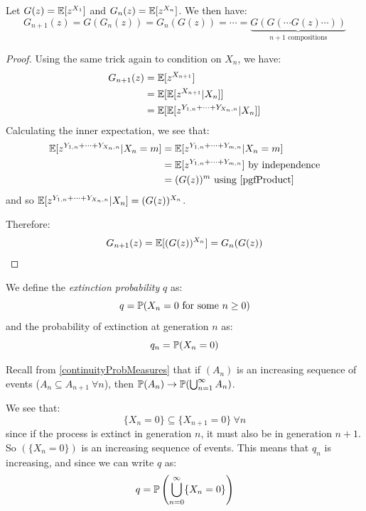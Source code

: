 \documentclass[../main.tex]{subfiles}
\begin{document}
\begin{theorem}
  Let $G(z) = \E[z^{X_1}]$ and $G_n(z) = \E[z^{X_n}]$.
  We then have:
  \label{GRecurrence}
  \[
    G_{n + 1}(z) = G(G_{n}(z)) = G_n(G(z)) = \cdots = \underbrace{G(G(\cdots G(z) \cdots))}_{n + 1 \text{ compositions}}
  \]
\end{theorem}
\begin{proof}
  Using the same trick again to condition on $X_n$, we have:
  \begin{align*}
    G_{n + 1}(z) &= \E[z^{X_{n + 1}}] \\
                 &= \E[\E[z^{X_{n + 1}} \vert X_n]] \\
                 &= \E[\E[z^{Y_{1, n} + \cdots + Y_{X_n, n}} \vert X_n]]
  \end{align*}
  Calculating the inner expectation, we see that:
  \begin{align*}
    \E[z^{Y_{1, n} + \cdots + Y_{X_n, n}} \vert X_n = m] &= \E[z^{Y_{1, n} + \cdots + Y_{m, n}} \vert X_n = m]\\
                                                         &= \E[z^{Y_{1, n} + \cdots + Y_{m, n}}] \text{ by independence}\\
                                                         &= (G(z))^{m} \text{ using \cref{pgfProduct}}
  \end{align*}
  and so $\E[z^{Y_{1, n} + \cdots + Y_{X_n, n}} \vert X_n] = (G(z))^{X_n}$.

  Therefore:
  \[
    G_{n + 1}(z) = \E[(G(z))^{X_n}] = G_n(G(z))
  \]
\end{proof}
\begin{definition}
  We define the \textit{extinction probability} $q$ as:
  \[
    q = \P(X_n = 0 \text{ for some $n \geq 0$})
  \]
  and the probability of extinction at generation $n$ as:
  \[
    q_n = \P(X_n = 0)
  \]
\end{definition}
\begin{remark}[Recap]
  Recall from \cref{continuityProbMeasures} that if $(A_n)$ is an increasing sequence of events ($A_n \subseteq A_{n + 1}\ \forall n$), then $\P(A_n) \to \P(\bigcup_{n = 1}^{\infty}  A_n)$.
\end{remark}
We see that:
\[
  \{X_n = 0\} \subseteq \{X_{n + 1} = 0\}\ \forall n
\]
since if the process is extinct in generation $n$, it must also be in generation $n + 1$.
So $(\{X_n = 0\})$ is an increasing sequence of events.
This means that $q_n$ is increasing, and since we can write $q$ as:
\[
  q = \P\left(\bigcup_{n = 0}^{\infty} \{X_n = 0\}\right)
\]
\end{document}
